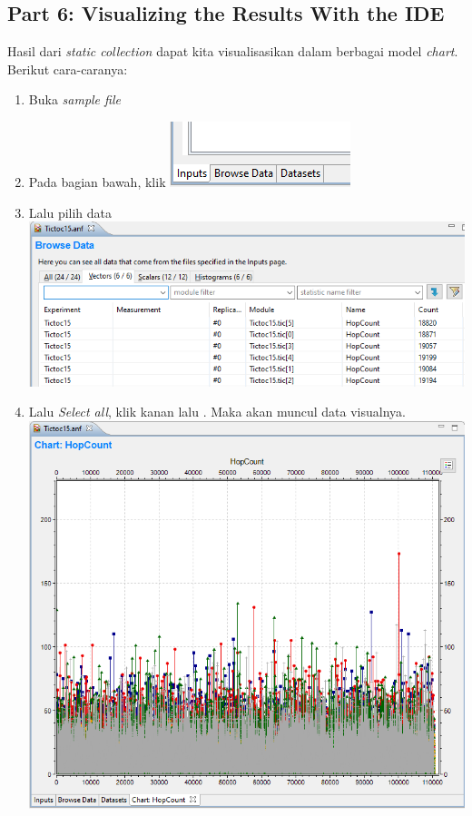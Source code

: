 \documentclass[conference]{IEEEtran}
\begin{document}
\subsection{Part 6: Visualizing the Results With the IDE}
Hasil dari \textit{static collection} dapat kita visualisasikan dalam berbagai model \textit{chart}. Berikut cara-caranya:
\begin{enumerate}
  \item Buka \textit{sample file} 
  \item Pada bagian bawah, klik 
        \includegraphics[scale=0.65]{images/browse-data-tab.png}
        \newpage
  \item Lalu pilih  data
        \includegraphics[scale=0.27]{images/vector-data.png}
  \item Lalu \textit{Select all}, klik kanan lalu . Maka akan muncul data visualnya.
        \includegraphics[scale=0.34]{images/plot-data.png}


\end{enumerate}
\end{document}
